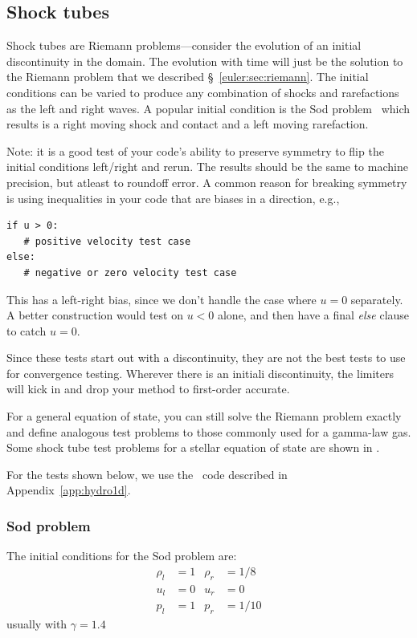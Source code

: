 \subsection{Shock tubes}
\label{sec:euler-methods:shocktubes}

Shock tubes are Riemann problems---consider the evolution of an
initial discontinuity in the domain.  The evolution with time will
just be the solution to the Riemann problem that we described
\S~\ref{euler:sec:riemann}.  The initial conditions can be varied to
produce any combination of shocks and rarefactions as the left and
right waves.  A popular initial condition is the Sod
problem~\cite{sod:1978} which results is a right moving shock and
contact and a left moving rarefaction.

Note: it is a good test of your code's ability to preserve symmetry to
flip the initial conditions left/right and rerun.  The results should
be the same to machine precision, but atleast to roundoff error.  A
common reason for breaking symmetry is using inequalities in your code
that are biases in a direction, e.g.,
\begin{lstlisting}
if u > 0:
   # positive velocity test case
else:
   # negative or zero velocity test case
\end{lstlisting}
This has a left-right bias, since we don't handle the case where $u =
0$ separately.  A better construction would test on $u < 0$ alone, and
then have a final {\em else} clause to catch $u = 0$.

Since these tests start out with a discontinuity, they are not the
best tests to use for convergence testing.  Wherever there is an
initiali discontinuity, the limiters will kick in and drop your
method to first-order accurate.

For a general equation of state, you can still solve the Riemann
problem exactly and define analogous test problems to those commonly
used for a gamma-law gas.  Some shock tube test problems for a stellar
equation of state are shown in \cite{zingalekatz}.

For the tests shown below, we use the \hydrooned\ code described in
Appendix~\ref{app:hydro1d}.

\subsubsection{Sod problem}

The initial conditions for the Sod problem \cite{sod:1978} are:
\begin{align}
\rho_l &= 1      &  \rho_r &= 1/8 \nonumber \\
u_l   &= 0       &  u_r    &= 0   \\
p_l    &= 1      &  p_r    &= 1/10 \nonumber
\end{align}
usually with $\gamma = 1.4$

